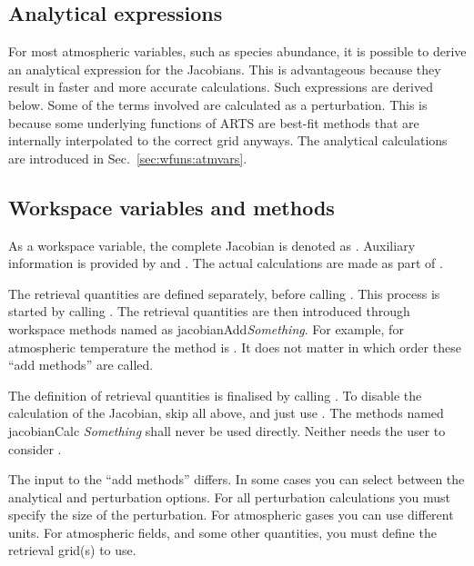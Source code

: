 \subsection{Analytical expressions}
\label{sec:wfuns:anal}
%
For most atmospheric variables, such as species abundance, it is possible to
derive an analytical expression for the Jacobians. This is advantageous because
they result in faster and more accurate calculations. Such expressions are
derived below. Some of the terms involved are calculated as a perturbation.
This is because some underlying functions of ARTS are best-fit methods that
are internally interpolated to the correct grid anyways. 
The analytical calculations are introduced in Sec.~\ref{sec:wfuns:atmvars}. 


\subsection{Workspace variables and methods}
\label{sec:wfuns:wsm}
%
As a workspace variable, the complete Jacobian is denoted as
. Auxiliary information is provided by
 and . The actual
calculations are made as part of .

The retrieval quantities are defined separately, before calling
. This process is started by calling .
The retrieval quantities are then introduced through workspace methods named as
jacobianAdd{\it Something}. For example, for atmospheric temperature the method
is . It does not matter in which order these
``add methods'' are called.

The definition of retrieval quantities is finalised by calling
. To disable the calculation of the Jacobian, skip all
above, and just use . The methods named jacobianCalc{\it
  Something} shall never be used directly. Neither needs the user to consider
.

The input to the ``add methods'' differs. In some cases you can select between
the analytical and perturbation options. For all perturbation calculations you
must specify the size of the perturbation. For atmospheric gases you can use
different units. For atmospheric fields, and some other quantities, you must
define the retrieval grid(s) to use.



